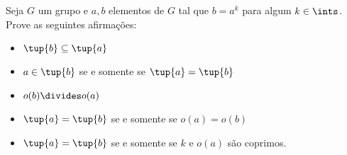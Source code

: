 \begin{exercise}
	Seja $G$ um grupo e $a, b$ elementos de $G$ tal que $b = a^k$ para algum $k \in \ints$.
	Prove as seguintes afirmações:
	\begin{itemize}
		\item $\tup{b} \subseteq \tup{a}$
		\item $a \in \tup{b}$ se e somente se $\tup{a} = \tup{b}$
		\item $o(b) \divides o(a)$
		\item $\tup{a} = \tup{b}$ se e somente se $o(a) = o(b)$
		\item $\tup{a} = \tup{b}$ se e somente se $k$ e $o(a)$ são coprimos.	
	\end{itemize}
\end{exercise}

